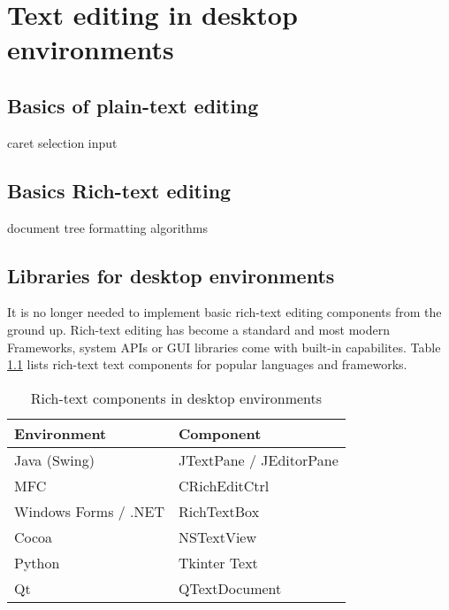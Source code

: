 
\chapter{Text editing in desktop environments}

\section{Basics of plain-text editing} %

caret
selection
input

\section{Basics Rich-text editing} %

document tree
formatting algorithms


\section{Libraries for desktop environments}

It is no longer needed to implement basic rich-text editing components from the ground up. Rich-text editing has become a standard and most modern Frameworks, system APIs or GUI libraries come with built-in capabilites. Table \ref{table:rich-text-components-desktop} lists rich-text text components for popular languages and frameworks.

\begin{table}[]
\centering
\begin{tabular}{ll}
\hline
Environment & Component \\ \hline
Java (Swing) & JTextPane / JEditorPane \\
MFC & CRichEditCtrl \\
Windows Forms / .NET & RichTextBox \\
Cocoa & NSTextView \\
Python & Tkinter Text \\
Qt & QTextDocument \\ \hline
\end{tabular}
\caption{Rich-text components in desktop environments}
\label{table:rich-text-components-desktop}
\end{table}

